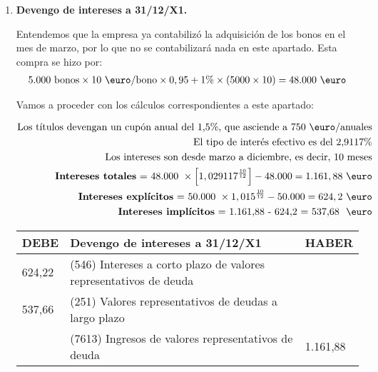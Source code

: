 \begin{enumerate}[label=\alph*)]
    \item \textbf{Devengo de intereses a 31/12/X1.}
    
    Entendemos que la empresa ya contabilizó la adquisición de los bonos en el mes de marzo, por lo que no se contabilizará nada en este apartado. Esta compra se hizo por:
    \begin{align*}
        5.000 \text{ bonos} \times 10 \text{ \euro/bono} \times 0,95 + 1\% \times (5000 \times 10) = 48.000 \text{ \euro}
    \end{align*}

    Vamos a proceder con los cálculos correspondientes a este apartado:

    \begin{align*}
        \text{Los títulos devengan un cupón anual del 1,5\%, que asciende a 750 \euro/anuales}\\
        \text{El tipo de interés efectivo es del 2,9117\%} \\
        \text{Los intereses son desde marzo a diciembre, es decir, 10 meses} \\
        \text{\textbf{Intereses totales} = 48.000 } \times \left[1,029117^{\frac{10}{12}}\right] - 48.000 = 1.161,88 \text{ \euro} \\
        \text{\textbf{Intereses explícitos} = 50.000 } \times 1,015^{\frac{10}{12}} - 50.000 = 624,2 \text{ \euro} \\
        \text{\textbf{Intereses implícitos} = 1.161,88 - 624,2 = 537,68 \text{ \euro}}
    \end{align*}

    \begin{table}[H]
        \centering
        \begin{tabular}{|p{3cm}|p{6cm}|p{3cm}|}
        \hline
        \rowcolor{blue!30}
        \textbf{DEBE} & \textbf{Devengo de intereses a 31/12/X1} & \textbf{HABER} \\
        \hline
        624,22 & (546) Intereses a corto plazo de valores representativos de deuda & \\
        \hline
        537,66 & (251) Valores representativos de deudas a largo plazo & \\
        \hline
        & (7613) Ingresos de valores representativos de deuda & 1.161,88 \\
        \hline
        \end{tabular}
    \end{table}


\end{enumerate}
